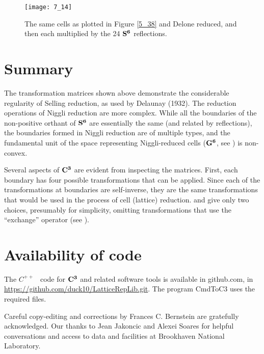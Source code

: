 \documentclass[]{iucr}              %
\numberwithin{equation}{section}
\newcommand{\SVI}[0]{$\bf{S^{6}}$}
\newcommand{\GVI}[0]{$\bf{G^{6}}$}
\newcommand{\CIII}[0]{$\bf{C^{3}}$}
\begin{document}
\begin{figure}
	\texttt{[image: 7\_14]}
	\label{7_14}
		\caption{The same cells as plotted in Figure \ref{5_38} 
	and Delone reduced, and then each multiplied by the 24
	\SVI{} reflections.}
\end{figure}
	
	\section{Summary}
	
	The transformation matrices shown above demonstrate the 
	considerable regularity of Selling reduction, as used by 
	Delaunay (1932). The reduction operations of Niggli 
	reduction \cite{Niggli1928} are more complex. 
	While all the boundaries of the non-positive 
	orthant of \SVI{} are essentially the same (and 
	related by reflections), the boundaries formed in 
	Niggli reduction are of multiple types, and the fundamental unit 
	of the space representing Niggli-reduced cells (\GVI{}, see ) is non-convex.
	
	Several aspects of \CIII{} are evident from inspecting the matrices. 
	First, each boundary has four possible 
	transformations that can be applied. Since each of 
	the transformations at boundaries are self-inverse, they are the 
	same transformations that would be used in the process of 
	cell (lattice) reduction.  and  give only two choices, presumably for simplicity, 
	omitting transformations that use the ``exchange'' operator 
	(see ).
	
	
	
	
	
	
	\section{Availability of code}
	
	The $C^{++}$ ~code for \CIII{} and related 
	software tools is available in github.com, in
	\url{https://github.com/duck10/LatticeRepLib.git}.
	The program CmdToC3 uses the required files.
	
	
	
	
	Careful copy-editing and corrections by Frances C. Bernstein are 
	gratefully acknowledged.
	Our thanks to Jean Jakoncic and Alexei Soares for 
	helpful conversations and access to data and facilities at 
	Brookhaven National Laboratory.
	
\end{document}
